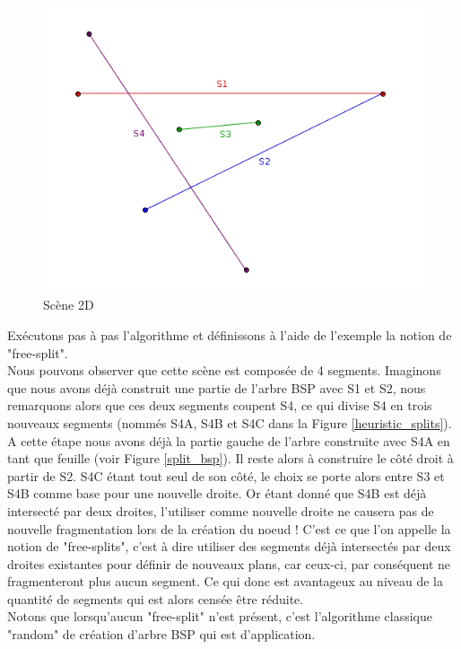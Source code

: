 \documentclass[11pt,a4paper]{article}
\theoremstyle{definition}
\theoremstyle{remark}
\begin{document}
\begin{figure}[!h]
\centering
\includegraphics[scale=0.5]{free_splits_2.png}
\caption{Scène 2D}
\label{scene_splits}
\end{figure}

Exécutons pas à pas l'algorithme et définissons à l'aide de l'exemple la notion de "free-split". \\

Nous pouvons observer que cette scène est composée de 4 segments. Imaginons que nous avons déjà construit une partie de l'arbre BSP avec S1 et S2, nous remarquons alors que ces deux segments coupent S4, ce qui divise S4 en trois nouveaux segments (nommés S4A, S4B et S4C dans la Figure \ref{heuristic_splits}). A cette étape nous avons déjà la partie gauche de l'arbre construite avec S4A en tant que feuille (voir Figure \ref{split_bsp}). Il reste alors à construire le côté droit à partir de S2. S4C étant tout seul de son côté, le choix se porte alors entre S3 et S4B comme base pour une nouvelle droite. Or étant donné que S4B est déjà intersecté par deux droites, l'utiliser comme nouvelle droite ne causera pas de nouvelle fragmentation lors de la création du noeud ! C'est ce que l'on appelle la notion de "free-splits", c'est à dire utiliser des segments déjà intersectés par deux droites existantes pour définir de nouveaux plans, car ceux-ci, par conséquent ne fragmenteront plus aucun segment. Ce qui donc est avantageux au niveau de la quantité de segments qui est alors censée être réduite.\\

Notons que lorsqu'aucun "free-split" n'est présent, c'est l'algorithme classique "random" de création d'arbre BSP qui est d'application. 
\end{document}
